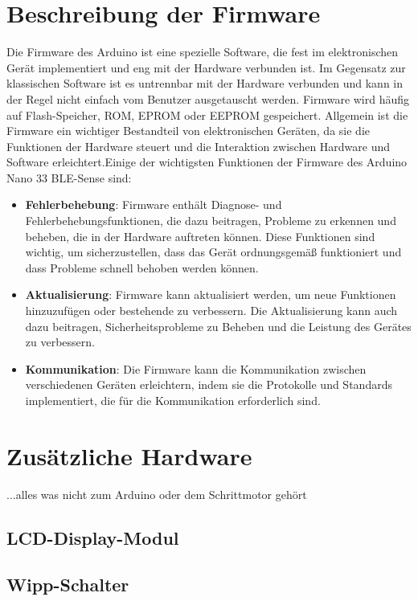 \section{Beschreibung der Firmware}
Die Firmware des Arduino ist eine spezielle Software, die fest im elektronischen Gerät implementiert und eng mit der Hardware verbunden ist. Im Gegensatz zur klassischen Software ist es untrennbar mit der Hardware verbunden und kann in der Regel nicht einfach vom Benutzer ausgetauscht werden. Firmware wird häufig auf Flash-Speicher, ROM, EPROM oder EEPROM gespeichert. Allgemein ist die Firmware ein wichtiger Bestandteil von elektronischen Geräten, da sie die Funktionen der Hardware steuert und die Interaktion zwischen Hardware und Software erleichtert.Einige der wichtigsten Funktionen der Firmware des Arduino Nano 33 BLE-Sense sind:
\\ \cite{Bruhlmann.2012}
\begin{itemize}
	\item \textbf{Fehlerbehebung}: Firmware enthält Diagnose- und Fehlerbehebungsfunktionen, die dazu beitragen, Probleme zu erkennen und beheben, die in der Hardware auftreten können. Diese Funktionen sind wichtig, um sicherzustellen, dass das Gerät ordnungsgemäß funktioniert und dass Probleme schnell behoben werden können. 
	\item \textbf{Aktualisierung}: Firmware kann aktualisiert werden, um neue Funktionen hinzuzufügen oder bestehende zu verbessern. Die Aktualisierung kann auch dazu beitragen, Sicherheitsprobleme zu Beheben und die Leistung des Gerätes zu verbessern. 
	\item \textbf{Kommunikation}: Die Firmware kann die Kommunikation zwischen verschiedenen Geräten erleichtern, indem sie die Protokolle und Standards implementiert, die für die Kommunikation erforderlich sind.
\end{itemize}
\section{Zusätzliche Hardware}
...alles was nicht zum Arduino oder dem Schrittmotor gehört

\subsection{LCD-Display-Modul}
\subsection{Wipp-Schalter}

